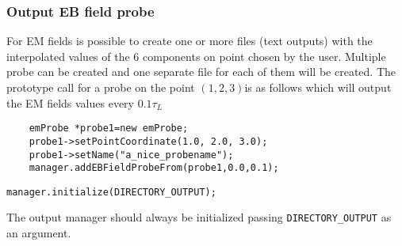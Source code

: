 \documentclass[11pt,a4paper]{report}
\begin{document}
\subsubsection{Output EB field probe}\label{em_probe}
For EM fields is possible to create one or more files (text outputs) with the interpolated values of the 6 components on point chosen by the user. Multiple probe can be created and one separate file for each of them will be created.
The prototype call for a probe on the point $(1,2,3)$is as follows which will output the EM fields values every $0.1\tau_L$

\begin{lstlisting}
	emProbe *probe1=new emProbe;
	probe1->setPointCoordinate(1.0, 2.0, 3.0);
	probe1->setName("a_nice_probename");
	manager.addEBFieldProbeFrom(probe1,0.0,0.1);
\end{lstlisting}

\begin{lstlisting}[backgroundcolor=\color{no_modify}]
	manager.initialize(DIRECTORY_OUTPUT);
\end{lstlisting}
The output manager should always be initialized passing \verb+DIRECTORY_OUTPUT+
as an argument.
\end{document}
